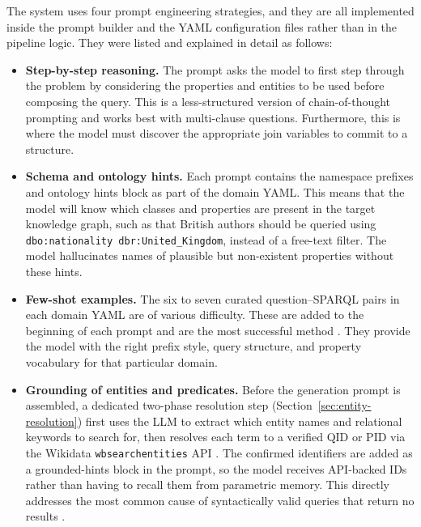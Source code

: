 \documentclass[11pt,a4paper]{article}
\begin{document}
The system uses four prompt engineering strategies, and they are all implemented inside the prompt builder and the YAML configuration files rather than in the pipeline logic. They were listed and explained in detail as follows:

\begin{itemize}
    \item \textbf{Step-by-step reasoning.} The prompt asks the model to first step through the problem by considering the properties and entities to be used before composing the query. This is a less-structured version of chain-of-thought prompting \cite{wei2022cot} and works best with multi-clause questions. Furthermore, this is where the model must discover the appropriate join variables to commit to a structure.

    \item \textbf{Schema and ontology hints.} Each prompt contains the namespace prefixes and ontology hints block as part of the domain YAML. This means that the model will know which classes and properties are present in the target knowledge graph, such as that British authors should be queried using \texttt{dbo:nationality dbr:United\_Kingdom}, instead of a free-text filter. The model hallucinates \cite{ji2023hallucination} names of plausible but non-existent properties without these hints.

    \item \textbf{Few-shot examples.} The six to seven curated question--SPARQL pairs in each domain YAML are of various difficulty. These are added to the beginning of each prompt and are the most successful method \cite{brown2020gpt3,liu2023fewshot}. They provide the model with the right prefix style, query structure, and property vocabulary for that particular domain.

    \item \textbf{Grounding of entities and predicates.} Before the generation prompt is assembled, a dedicated two-phase resolution step (Section~\ref{sec:entity-resolution}) first uses the LLM to extract which entity names and relational keywords to search for, then resolves each term to a verified QID or PID via the Wikidata \texttt{wbsearchentities} API \cite{vrandecic2014wikidata}. The confirmed identifiers are added as a grounded-hints block in the prompt, so the model receives API-backed IDs rather than having to recall them from parametric memory. This directly addresses the most common cause of syntactically valid queries that return no results \cite{diefenbach2018core}.
\end{itemize}
\end{document}
